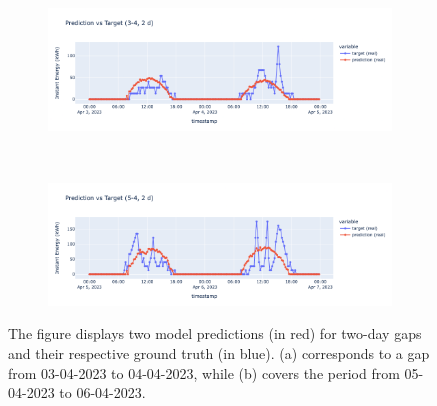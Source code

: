 
\begin{figure}[H]
	\centering
	\begin{subfigure}{\textwidth}
		\centering
		\includegraphics[width=.8\textwidth]{chapters/3_models/imgs/ufnc/eval/ufcpred3-4.png}
		\caption{}
	\end{subfigure}\\
	\begin{subfigure}{\textwidth}
		\centering
		\includegraphics[width=.8\textwidth]{chapters/3_models/imgs/ufnc/eval/ufcpred5-4.png}
		\caption{}
	\end{subfigure}
	\caption{The figure displays two model predictions (in red) for two-day gaps and their respective ground truth (in blue). (a) corresponds to a gap from 03-04-2023 to 04-04-2023, while (b) covers the period from 05-04-2023 to 06-04-2023.}
	\label{fig:ufcnevalbrutti}
\end{figure}

